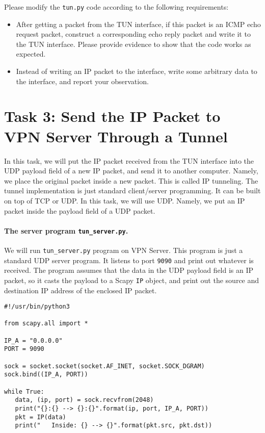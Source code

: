 Please modify the \texttt{tun.py} code according to the following requirements:

\begin{itemize}
\item After getting a packet from the TUN interface, if this packet
is an ICMP echo request packet, construct a corresponding 
echo reply packet and write it to the TUN interface. Please provide
evidence to show that the code works as expected. 

\item Instead of writing an IP packet to the interface, write some arbitrary data to the 
interface, and report your observation. 
\end{itemize}
 




\section{Task 3: Send the IP Packet to VPN Server Through a Tunnel} 


In this task, we will put the IP packet received from the TUN interface
into the UDP payload field of a new IP packet, and send it to another computer. 
Namely, we place the original packet inside a new packet. This is called IP tunneling. 
The tunnel implementation is just standard client/server programming.
It can be built on top of TCP or UDP. In this task, we will use UDP.
Namely, we put an IP packet inside the payload field of a UDP packet. 


\paragraph{The server program \texttt{tun\_server.py}.}
We will run \texttt{tun\_server.py} program on VPN Server.
This program is just a standard UDP server program. It 
listens to port \texttt{9090} and print out whatever is 
received.  The program assumes that the data in the UDP payload 
field is an IP packet, so it 
casts the payload to a Scapy \texttt{IP} object, and print out 
the source and destination IP address of the enclosed IP packet. 


\begin{lstlisting}[caption={\texttt{tun\_server.py}}, label=vpn:list:tun_server]
#!/usr/bin/python3

from scapy.all import *

IP_A = "0.0.0.0"
PORT = 9090

sock = socket.socket(socket.AF_INET, socket.SOCK_DGRAM)
sock.bind((IP_A, PORT))

while True:
   data, (ip, port) = sock.recvfrom(2048)
   print("{}:{} --> {}:{}".format(ip, port, IP_A, PORT))
   pkt = IP(data)
   print("   Inside: {} --> {}".format(pkt.src, pkt.dst))
\end{lstlisting}




